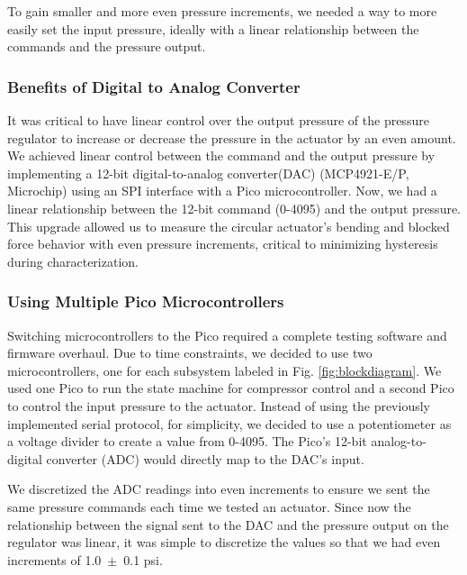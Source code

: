 To gain smaller and more even pressure increments, we needed a way to more easily set the input pressure, ideally with a linear relationship between the commands and the pressure output. 

\subsubsection{Benefits of Digital to Analog Converter}

It was critical to have linear control over the output pressure of the pressure regulator to increase or decrease the pressure in the actuator by an even amount. We achieved linear control between the command and the output pressure by implementing a 12-bit digital-to-analog converter(DAC) (MCP4921-E/P, Microchip) using an SPI interface with a Pico microcontroller. Now, we had a linear relationship between the 12-bit command (0-4095) and the output pressure. This upgrade allowed us to measure the circular actuator's bending and blocked force behavior with even pressure increments, critical to minimizing hysteresis during characterization. 

\subsubsection{Using Multiple Pico Microcontrollers}

Switching microcontrollers to the Pico required a complete testing software and firmware overhaul. Due to time constraints, we decided to use two microcontrollers, one for each subsystem labeled in Fig. \ref{fig:blockdiagram}. We used one Pico to run the state machine for compressor control and a second Pico to control the input pressure to the actuator. Instead of using the previously implemented serial protocol, for simplicity, we decided to use a potentiometer as a voltage divider to create a value from 0-4095. The Pico's 12-bit analog-to-digital converter (ADC) would directly map to the DAC's input. 

We discretized the ADC readings into even increments to ensure we sent the same pressure commands each time we tested an actuator. Since now the relationship between the signal sent to the DAC and the pressure output on the regulator was linear, it was simple to discretize the values so that we had even increments of 1.0~$\pm$~0.1 psi. 
